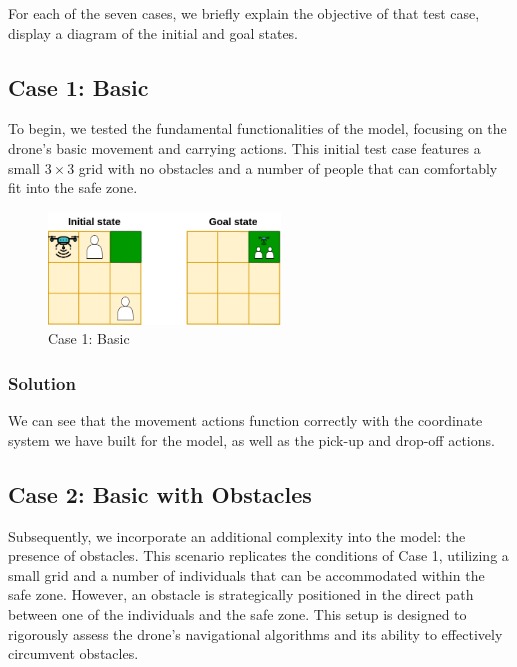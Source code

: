 \documentclass{article}
\begin{document}
For each of the seven cases, we briefly explain the objective of that test case, display a diagram of the initial and goal states.


\subsection{Case 1: Basic}

To begin, we tested the fundamental functionalities of the model, focusing on the drone's basic movement and carrying actions. This initial test case features a small \(3 \times 3\) grid with no obstacles and a number of people that can comfortably fit into the safe zone.

\begin{figure}[ht]
    \centering
    \includegraphics[width=0.55\textwidth]{assets/problem-1-basic.drawio.png}
    \caption{Case 1: Basic}
    \label{fig:initial-state}
\end{figure}

\subsubsection{Solution}
We can see that the movement actions function correctly with the coordinate system we have built for the model, as well as the pick-up and drop-off actions.

\subsection{Case 2: Basic with Obstacles}

Subsequently, we incorporate an additional complexity into the model: the presence of obstacles. This scenario replicates the conditions of Case 1, utilizing a small grid and a number of individuals that can be accommodated within the safe zone. However, an obstacle is strategically positioned in the direct path between one of the individuals and the safe zone. This setup is designed to rigorously assess the drone's navigational algorithms and its ability to effectively circumvent obstacles.
\end{document}
